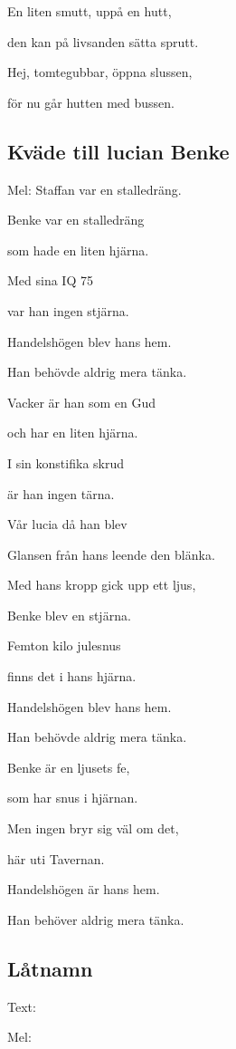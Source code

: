 En liten smutt, uppå en hutt,

den kan på livsanden sätta sprutt.

Hej, tomtegubbar, öppna slussen,

för nu går hutten med bussen.

\subsection{\textbf{Kväde till lucian Benke}}

Mel: Staffan var en stalledräng. \bigskip


Benke var en stalledräng

som hade en liten hjärna.

Med sina IQ 75

var han ingen stjärna.

Handelshögen blev hans hem.

Han behövde aldrig mera tänka. \bigskip

Vacker är han som en Gud

och har en liten hjärna.

I sin konstifika skrud

är han ingen tärna.

Vår lucia då han blev

Glansen från hans leende den blänka. \bigskip

Med hans kropp gick upp ett ljus,

Benke blev en stjärna.

Femton kilo julesnus

finns det i hans hjärna.

Handelshögen blev hans hem.

Han behövde aldrig mera tänka. \bigskip

Benke är en ljusets fe,

som har snus i hjärnan.

Men ingen bryr sig väl om det,

här uti Tavernan.

Handelshögen är hans hem.

Han behöver aldrig mera tänka.\bigskip

\subsection{\textbf{Låtnamn}}

Text: 

Mel: \bigskip


\newpage